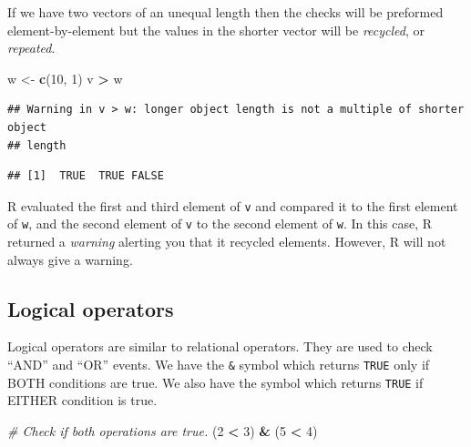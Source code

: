 \documentclass[
]{book}
\newenvironment{Shaded}{\begin{snugshade}}{\end{snugshade}}
\newcommand{\CommentTok}[1]{\textcolor[rgb]{0.56,0.35,0.01}{\textit{#1}}}
\newcommand{\DecValTok}[1]{\textcolor[rgb]{0.00,0.00,0.81}{#1}}
\newcommand{\KeywordTok}[1]{\textcolor[rgb]{0.13,0.29,0.53}{\textbf{#1}}}
\newcommand{\NormalTok}[1]{#1}
\newcommand{\OperatorTok}[1]{\textcolor[rgb]{0.81,0.36,0.00}{\textbf{#1}}}
\newcommand{\StringTok}[1]{\textcolor[rgb]{0.31,0.60,0.02}{#1}}
\begin{document}
If we have two vectors of an unequal length then the checks will be preformed element-by-element but the values in the shorter vector will be \emph{recycled}, or \emph{repeated}.

\begin{Shaded}
\begin{Highlighting}[]
\NormalTok{w <-}\StringTok{ }\KeywordTok{c}\NormalTok{(}\DecValTok{10}\NormalTok{, }\DecValTok{1}\NormalTok{)}
\NormalTok{v }\OperatorTok{>}\StringTok{ }\NormalTok{w}
\end{Highlighting}
\end{Shaded}

\begin{verbatim}
## Warning in v > w: longer object length is not a multiple of shorter object
## length
\end{verbatim}

\begin{verbatim}
## [1]  TRUE  TRUE FALSE
\end{verbatim}

R evaluated the first and third element of \texttt{v} and compared it to the first element of \texttt{w}, and the second element of \texttt{v} to the second element of \texttt{w}. In this case, R returned a \emph{warning} alerting you that it recycled elements. However, R will not always give a warning.

\hypertarget{logical-operators}{%
\subsection*{Logical operators}\label{logical-operators}}

Logical operators are similar to relational operators. They are used to check ``AND'' and ``OR'' events. We have the \texttt{\&} symbol which returns \texttt{TRUE} only if BOTH conditions are true. We also have the \texttt{\textbar{}} symbol which returns \texttt{TRUE} if EITHER condition is true.

\begin{Shaded}
\begin{Highlighting}[]
\CommentTok{# Check if both operations are true.}
\NormalTok{(}\DecValTok{2} \OperatorTok{<}\StringTok{ }\DecValTok{3}\NormalTok{) }\OperatorTok{&}\StringTok{ }\NormalTok{(}\DecValTok{5} \OperatorTok{<}\StringTok{ }\DecValTok{4}\NormalTok{)}
\end{Highlighting}
\end{Shaded}
\end{document}
